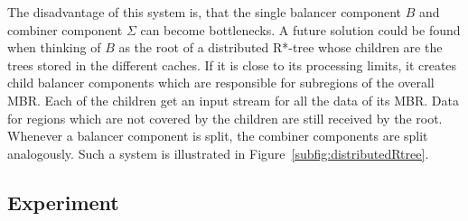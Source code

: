 The disadvantage of this system is, that the single balancer component $B$ and combiner component $\Sigma$ can become bottlenecks. A future solution could be found when thinking of $B$ as the root of a distributed R*-tree whose children are the trees stored in the different caches. If it is close to its processing limits, it creates child balancer components which are responsible for subregions of the overall MBR. Each of the children get an input stream for all the data of its MBR. Data for regions which are not covered by the children are still received by the root. Whenever a balancer component is split, the combiner components are split analogously. Such a system is illustrated in Figure~\ref{subfig:distributedRtree}.

\subsection{Experiment}\label{sec:experiment}
